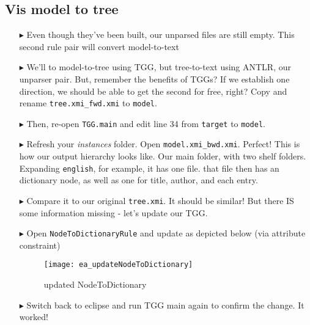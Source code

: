 \newpage
\hypertarget{m2tvis}{}
\subsection{Vis model to tree}
\visHeader

\begin{itemize}

\item[$\blacktriangleright$] Even though they've been built, our unparsed files are still empty. This second rule pair will convert model-to-text

\item[$\blacktriangleright$] We'll to model-to-tree using TGG, but tree-to-text using ANTLR, our unparser pair. But, remember the benefits of TGGs? If we
establish one direction, we should be able to get the second for free, right? Copy and rename \texttt{tree.xmi\_fwd.xmi} to \texttt{model}.

\item[$\blacktriangleright$] Then, re-open \texttt{TGG.main} and edit line 34 from \texttt{target} to \texttt{model}.
	
\item[$\blacktriangleright$] Refresh your \emph{instances} folder. Open \texttt{model.xmi\_bwd.xmi}. Perfect! This is how our output hierarchy looks like. Our
main folder, with two shelf folders. Expanding \texttt{english}, for example, it has one file. that file then has an dictionary node, as well as
one for title, author, and each entry.

\item[$\blacktriangleright$] Compare it to our original \texttt{tree.xmi}. It should be similar! But there IS some information missing - let's update our TGG.

\item[$\blacktriangleright$] Open \texttt{NodeToDictionaryRule} and update as depicted below (via attribute constraint)

\begin{figure}[htp]
\begin{center}
  \texttt{[image: ea\_updateNodeToDictionary]}
  \caption{updated NodeToDictionary}
  \label{ea:NodeToDictionary_updated}
\end{center}
\end{figure}

\item[$\blacktriangleright$] Switch back to eclipse and run TGG main again to confirm the change. It worked!


\end{itemize}
